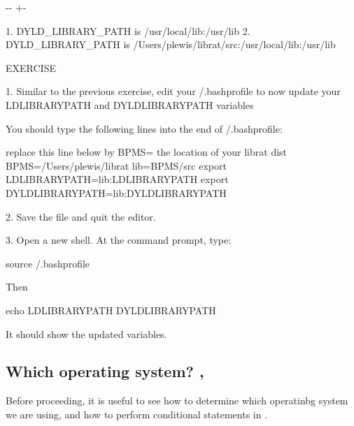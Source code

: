 \documentclass[letterpaper,10pt,english]{sphinxmanual}
\newlength\nbsphinxcodecellspacing
\begin{document}
{

\kern-\sphinxverbatimsmallskipamount\kern-\baselineskip
\kern+\FrameHeightAdjust\kern-\fboxrule
\vspace{\nbsphinxcodecellspacing}

\begin{sphinxVerbatim}[commandchars=\\\{\}]
1. DYLD\_LIBRARY\_PATH is /usr/local/lib:/usr/lib
2. DYLD\_LIBRARY\_PATH is /Users/plewis/librat/src:/usr/local/lib:/usr/lib
\end{sphinxVerbatim}
}

\begin{sphinxVerbatim}[commandchars=\\\{\}]
EXERCISE

    1. Similar to the previous exercise, edit your \PYGZti{}/.bash\PYGZus{}profile to now update your LD\PYGZus{}LIBRARY\PYGZus{}PATH and DYLD\PYGZus{}LIBRARY\PYGZus{}PATH variables

    You should type the following lines into the end of \PYGZti{}/.bash\PYGZus{}profile:

    \PYGZsh{} replace this line below by BPMS= the location of your librat dist
    BPMS=/Users/plewis/librat
    lib=\PYGZdl{}BPMS/src
    export LD\PYGZus{}LIBRARY\PYGZus{}PATH=\PYGZdq{}\PYGZdl{}lib:\PYGZdl{}LD\PYGZus{}LIBRARY\PYGZus{}PATH\PYGZdq{}
    export DYLD\PYGZus{}LIBRARY\PYGZus{}PATH=\PYGZdq{}\PYGZdl{}lib:\PYGZdl{}DYLD\PYGZus{}LIBRARY\PYGZus{}PATH\PYGZdq{}


    2. Save the file and quit the editor.

    3. Open a new shell. At the command prompt, type:

            source \PYGZti{}/.bash\PYGZus{}profile

    Then

            echo \PYGZdl{}LD\PYGZus{}LIBRARY\PYGZus{}PATH \PYGZdl{}DYLD\PYGZus{}LIBRARY\PYGZus{}PATH

    It should show the updated variables.
\end{sphinxVerbatim}


\subsection{Which operating system? , }
\label{\detokenize{Appendix1:Which-operating-system?-uname,-if}}
Before proceeding, it is useful to see how to determine which operatinbg system we are using, and how to perform conditional statements in .
\end{document}
